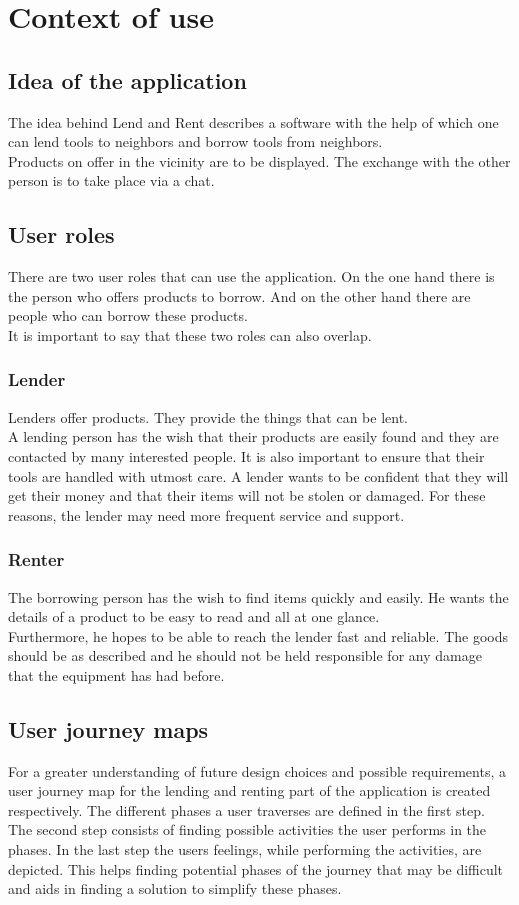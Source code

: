 
\section{Context of use}
\subsection{Idea of the application}
The idea behind Lend and Rent describes a software with the help of which one can lend tools to neighbors and borrow tools from neighbors.\\
Products on offer in the vicinity are to be displayed. The exchange with the other person is to take place via a chat. 
\subsection{User roles}
There are two user roles that can use the application. On the one hand there is the person who offers products to borrow. And on the other hand there are people who can borrow these products.\\
It is important to say that these two roles can also overlap. 
\subsubsection{Lender}
Lenders offer products. They provide the things that can be lent. \\
A lending person has the wish that their products are easily found and they are contacted by many interested people. It is also important to ensure that their tools are handled with utmost care. A lender wants to be confident that they will get their money and that their items will not be stolen or damaged. For these reasons, the lender may need more frequent service and support.
\subsubsection{Renter}
The borrowing person has the wish to find items quickly and easily. He wants the details of a product to be easy to read and all at one glance.\\
 Furthermore, he hopes to be able to reach the lender fast and reliable. The goods should be as described and he should not be held responsible for any damage that the equipment has had before.

\subsection{User journey maps}
		For a greater understanding of future design choices and possible requirements, a user journey map for the lending and renting part of the application is created respectively. The different phases a user traverses are defined in the first step. The second step consists of finding possible activities the user performs in the phases. In the last step the users feelings, while performing the activities, are depicted. This helps finding potential phases of the journey that may be difficult and aids in finding a solution to simplify these phases.\\
		
